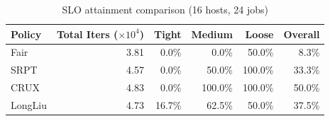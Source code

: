 \begin{table}[t]
\centering
\caption{SLO attainment comparison (16 hosts, 24 jobs)}
\label{tab:slo_16host}
\begin{tabular}{l|r|r|r|r|r}
\hline
Policy & Total Iters ($\times 10^4$) & Tight & Medium & Loose & Overall \\
\hline
Fair & 3.81 & 0.0\% & 0.0\% & 50.0\% & 8.3\% \\
SRPT & 4.57 & 0.0\% & 50.0\% & 100.0\% & 33.3\% \\
CRUX & 4.83 & 0.0\% & 100.0\% & 100.0\% & 50.0\% \\
LongLiu & 4.73 & 16.7\% & 62.5\% & 50.0\% & 37.5\% \\
\hline
\end{tabular}
\end{table}
